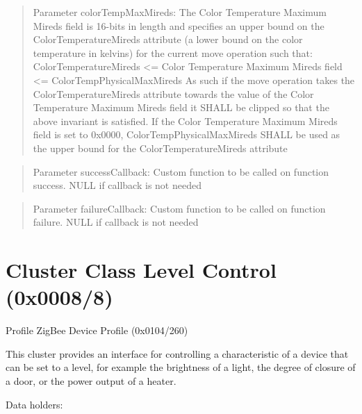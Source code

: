\begin{quote}Parameter colorTempMaxMireds: The Color Temperature Maximum Mireds field is 16-bits in length and specifies an upper bound on the ColorTemperatureMireds attribute (a lower bound on the color temperature in kelvins) for the current move operation such that: ColorTemperatureMireds <= Color Temperature Maximum Mireds field <= ColorTempPhysicalMaxMireds As such if the move operation takes the ColorTemperatureMireds attribute towards the value of the Color Temperature Maximum Mireds field it SHALL be clipped so that the above invariant is satisfied. If the Color Temperature Maximum Mireds field is set to 0x0000, ColorTempPhysicalMaxMireds SHALL be used as the upper bound for the ColorTemperatureMireds attribute\end{quote}
\begin{quote}Parameter successCallback: Custom function to be called on function success. NULL if callback is not needed\end{quote}
\begin{quote}Parameter failureCallback: Custom function to be called on function failure. NULL if callback is not needed\end{quote}



\section{Cluster Class Level Control (0x0008/8)}

Profile ZigBee Device Profile (0x0104/260)

This cluster provides an interface for controlling a characteristic of a device that can be set to a level, for example the brightness of a light, the degree of closure of a door, or the power output of a heater.
\newline

\noindent
Data holders:

